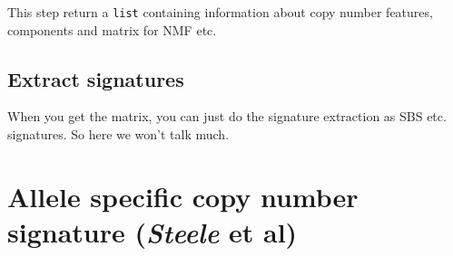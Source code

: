 \documentclass[
  12pt,
  a4paper,
  twoside]{book}
\newenvironment{Shaded}{\begin{snugshade}}{\end{snugshade}}
\newcommand{\AttributeTok}[1]{\textcolor[rgb]{0.77,0.63,0.00}{#1}}
\newcommand{\CommentTok}[1]{\textcolor[rgb]{0.56,0.35,0.01}{\textit{#1}}}
\newcommand{\DecValTok}[1]{\textcolor[rgb]{0.00,0.00,0.81}{#1}}
\newcommand{\DocumentationTok}[1]{\textcolor[rgb]{0.56,0.35,0.01}{\textbf{\textit{#1}}}}
\newcommand{\FunctionTok}[1]{\textcolor[rgb]{0.00,0.00,0.00}{#1}}
\newcommand{\NormalTok}[1]{#1}
\newcommand{\OtherTok}[1]{\textcolor[rgb]{0.56,0.35,0.01}{#1}}
\newcommand{\SpecialCharTok}[1]{\textcolor[rgb]{0.00,0.00,0.00}{#1}}
\begin{document}
This step return a \texttt{list} containing information about copy number features, components and matrix for NMF etc.

\hypertarget{extract-signatures}{%
\subsection{Extract signatures}\label{extract-signatures}}

When you get the matrix, you can just do the signature extraction as SBS etc. signatures. So here we won't talk much.

\begin{Shaded}
\end{Shaded}

\begin{Shaded}
\end{Shaded}

\hypertarget{allele-specific-copy-number-signature-steele-et-al}{%
\section{\texorpdfstring{Allele specific copy number signature (\emph{Steele} et al)}{Allele specific copy number signature (Steele et al)}}\label{allele-specific-copy-number-signature-steele-et-al}}
\end{document}
